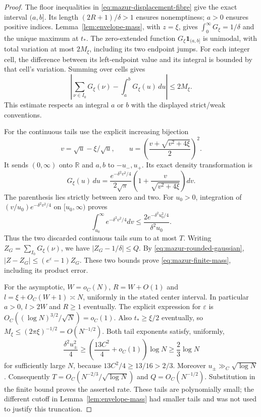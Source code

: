 \documentclass[11pt]{article}
\theoremstyle{remark}\newtheorem{remark}[proposition]{Remark}
\begin{document}
\begin{proof}
The floor inequalities in
\eqref{eq:mazur-displacement-fibre} give the exact interval $(a,b]$.
Its length $(2R+1)/\delta>1$ ensures nonemptiness; $a>0$ ensures
positive indices. Lemma~\ref{lem:envelope-mass}, with $z=\xi$,
gives $\int_0^\infty G_\xi=1/\delta$ and the unique maximum at
$t_*$. The zero-extended function $G_\xi\mathbf1_{(a,b]}$ is
unimodal, with total variation at most $2M_\xi$, including its two
endpoint jumps. For each integer cell, the difference between its
left-endpoint value and its integral is bounded by that cell's
variation. Summing over cells gives
\[
 \left|\sum_{\nu\in I_0}G_\xi(\nu)-\int_a^bG_\xi(u)\,du\right|
 \le 2M_\xi.
\]
This estimate respects an integral $a$ or $b$ with the displayed
strict/weak conventions.

For the continuous tails use the explicit increasing bijection
\[
 v=\sqrt u-\xi/\sqrt u,\qquad
 u=\left(\frac{v+\sqrt{v^2+4\xi}}2\right)^2.
\]
It sends $(0,\infty)$ onto $\mathbb R$ and $a,b$ to $-u_-,u_+$.
Its exact density transformation is
\[
 G_\xi(u)\,du=\frac{e^{-\delta^2v^2/4}}{2\sqrt\pi}
       \left(1+\frac v{\sqrt{v^2+4\xi}}\right)dv.
\]
The parenthesis lies strictly between zero and two.
For $u_0>0$, integration of
$(v/u_0)e^{-\delta^2v^2/4}$ on $[u_0,\infty)$ proves
\[
 \int_{u_0}^\infty e^{-\delta^2v^2/4}dv
 \le\frac{2e^{-\delta^2u_0^2/4}}{\delta^2u_0}.
\]
Thus the two discarded continuous tails sum to at most $T$.
Writing $Z_G=\sum_{I_0}G_\xi(\nu)$, we have
$|Z_G-1/\delta|\le Q$. By
\eqref{eq:mazur-rounded-gaussian},
$|Z-Z_G|\le(e^\varepsilon-1)Z_G$.
These two bounds prove \eqref{eq:mazur-finite-mass}, including
its product error.

For the asymptotic, $W=o_C(N)$, $R=W+O(1)$ and
$l=\xi+O_C(W+1)\asymp N$, uniformly in the stated center interval.
In particular $a>0$, $l>2W$ and $R\ge1$ eventually.
The explicit expression for $\varepsilon$ is
$O_C((\log N)^{3/2}/\sqrt N)=o_C(1)$.
Also $t_*\ge\xi/2$ eventually, so
$M_\xi\le(2\pi\xi)^{-1/2}=O(N^{-1/2})$.
Both tail exponents satisfy, uniformly,
\[
 \frac{\delta^2u_\pm^2}{4}
 \ge\left(\frac{13C^2}{4}+o_C(1)\right)\log N
 \ge\frac23\log N
\]
for sufficiently large $N$, because $13C^2/4\ge13/16>2/3$.
Moreover $u_\pm\gg_C\sqrt{\log N}$. Consequently
$T=O_C(N^{-2/3}/\sqrt{\log N})$ and $Q=O_C(N^{-1/2})$.
Substitution in the finite bound proves the asserted rate.
These tails are polynomially small; the different cutoff in
Lemma~\ref{lem:envelope-mass} had smaller tails and was not used
to justify this truncation.
\end{proof}
\end{document}
